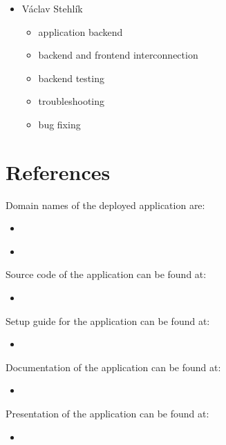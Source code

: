 \documentclass[11pt,a4paper]{article}
\begin{document}
\begin{itemize}
    \item Václav Stehlík
    \begin{itemize}
        \item application backend
        \item backend and frontend interconnection
        \item backend testing
        \item troubleshooting
        \item bug fixing
    \end{itemize}
\end{itemize}

\section{References}\label{sec:references}

Domain names of the deployed application are:
\begin{itemize}
    \item \href{https://pa181.eu-de.mybluemix.net/}{\color{urlColor}{pa181.eu-de.mybluemix.net}}
    \item \href{https://pa181.eu-de.cf.appdomain.cloud/}{\color{urlColor}{pa181.eu-de.cf.appdomain.cloud}}
\end{itemize}

Source code of the application can be found at:
\begin{itemize}
    \item \href{https://github.com/europ/MUNI-FI-PA181/tree/master/src}{\color{urlColor}{github.com/europ/MUNI-FI-PA181/tree/master/src}}
\end{itemize}

Setup guide for the application can be found at:
\begin{itemize}
    \item \href{https://github.com/europ/MUNI-FI-PA181/wiki/Setup}{\color{urlColor}{github.com/europ/MUNI-FI-PA181/wiki/Setup}}
\end{itemize}

Documentation of the application can be found at:
\begin{itemize}
    \item \href{https://github.com/europ/MUNI-FI-PA181/blob/master/doc/doc.pdf}{\color{urlColor}{github.com/europ/MUNI-FI-PA181/blob/master/doc/doc.pdf}}
\end{itemize}

Presentation of the application can be found at:
\begin{itemize}
    \item \href{https://github.com/europ/MUNI-FI-PA181/blob/master/pres/pres.pdf}{\color{urlColor}{github.com/europ/MUNI-FI-PA181/blob/master/pres/pres.pdf}}
\end{itemize}
\end{document}
